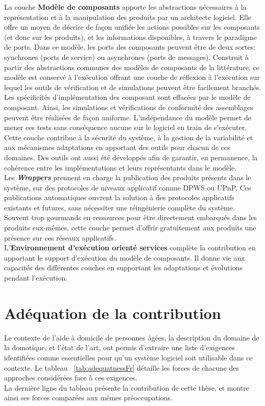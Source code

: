 La couche {\bf Modèle de composants} apporte les abstractions nécessaires à la représentation et à la manipulation des produits par un architecte logiciel. Elle offre un moyen de décrire de façon unifiée les actions possibles sur les composants (et donc sur les produits), et les informations disponibles, à travers le paradigme de ports. Dans ce modèle, les ports des composants peuvent être de deux sortes: synchrones (ports de service) ou asynchrones (ports de messages). Construit à partir des abstractions communes des modèles de composants de la littérature, ce modèle est conservé à l'exécution offrant une couche de réflexion à l'exécution sur lequel les outils de vérification et de simulations peuvent être facilement branchés.  Les spécificités d'implémentation des composant sont effacées par le modèle de composant. Ainsi, les simulations et vérifications de conformité des assemblages peuvent être réalisées de façon uniforme. L'indépendance du modèle permet de mener ces tests sans conséquence aucune sur le logiciel en train de s'exécuter. Cette couche contribue à la sécurité du système, à la gestion de la variabilité et aux mécanismes adaptations en apportant des outils pour chacun de ces domaines. Des outils ont aussi été développés afin de garantir, en permanence, la cohérence entre les implémentations et leurs représentants dans le modèle.\\



Les {\it\bf Wrappers} prennent en charge la publication des produits présents dans le système, sur des protocoles de niveaux applicatif comme DPWS ou UPnP. Ces publications automatiques ouvrent la solution à des protocoles applicatifs existants et futures, sans nécessiter une réingénierie complète du système. Souvent trop gourmands en ressources pour être directement embarqués dans les produits eux-mêmes, cette couche permet d'offrir gratuitement aux produits une présence sur ces réseaux applicatifs.\\

L'{\bf Environnement d'exécution orienté services} complète la contribution en apportant le support d'exécution du modèle de composants. Il donne vie aux capacités des différentes couches en supportant les adaptations et évolutions pendant l'exécution.\\


\section{Adéquation de la contribution}
\label{sec:adequationFr}
Le contexte de l'aide à domicile de personnes âgées, la description du domaine de la domotique, et l'état de l'art, ont permis d'extraire une liste d'exigences identifiées comme essentielles pour qu'un système logiciel soit utilisable dans ce contexte. Le tableau ~\ref{tab:adequatnessFr} détaille les forces de chacune des approches considérées face à ces exigences.\\
La dernière ligne du tableau présente la contribution de cette thèse, et montre ainsi ses forces comparées aux mêmes préoccupations.\\


